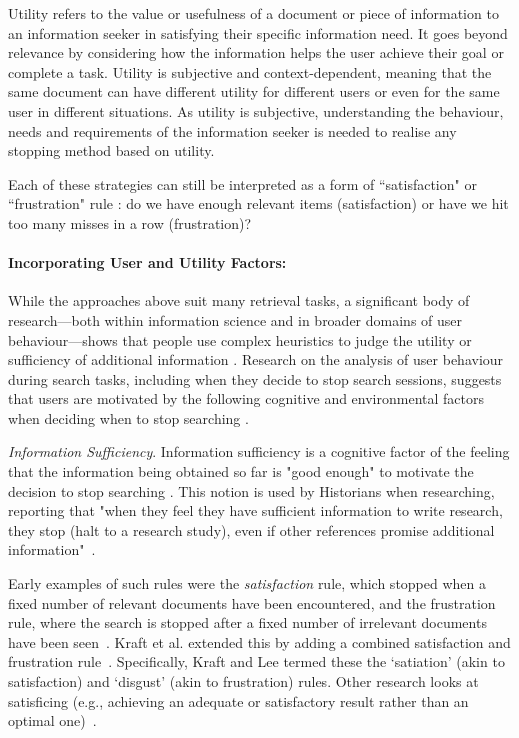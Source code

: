 \documentclass[10pt,oneside]{book}
\begin{document}
Utility refers to the value or usefulness of a document or piece of information to an information seeker in satisfying their specific information need. It goes beyond relevance by considering how the information helps the user achieve their goal or complete a task. Utility is subjective and context-dependent, meaning that the same document can have different utility for different users or even for the same user in different situations. As utility is subjective, understanding the behaviour, needs and requirements of the information seeker is needed to realise any stopping method based on utility. 

Each of these strategies can still be interpreted as a form of ``satisfaction" or ``frustration" rule \cite{ilani_analysis_2024, cooper_selecting_1973}: do we have enough relevant items (satisfaction) or have we hit too many misses in a row (frustration)?

\paragraph{Incorporating User and Utility Factors: }

While the approaches above suit many retrieval tasks, a significant body of research—both within information science and in broader domains of user behaviour—shows that people use complex heuristics to judge the utility or sufficiency of additional information \cite{nickles_judgment-based_1995, browne_stopping_2005, ilani_analysis_2024}. Research on the analysis of user behaviour during search tasks, including when they decide to stop search sessions, suggests that users are motivated by the following cognitive and environmental factors when deciding when to stop searching \cite{ilani_analysis_2024}.

\emph{Information Sufficiency}. Information sufficiency is a cognitive factor of the feeling that the information being obtained so far is "good enough" to motivate the decision to stop searching \cite{cooper_selecting_1973,prabha_what_2007,zach_when_2005,dostert_users_2009}. This notion is used by Historians when researching, reporting that "when they feel they have sufficient information to write research, they stop (halt to a research study), even if other references promise additional information"~\cite{dalton_historians_2004}.

Early examples of such rules were the \emph{satisfaction} rule, which stopped when a fixed number of relevant documents have been encountered, and the frustration rule, where the search is stopped after a fixed number of irrelevant documents have been seen~\cite{cooper_selecting_1973}. Kraft et al. extended this by adding a combined satisfaction and frustration rule~\cite{kraft_stopping_1979}. Specifically, Kraft and Lee termed these the `satiation' (akin to satisfaction) and `disgust' (akin to frustration) rules. Other research looks at satisficing (e.g., achieving an adequate or satisfactory result rather than an optimal one)~\cite{simon_behavioral_1955}.
\end{document}
